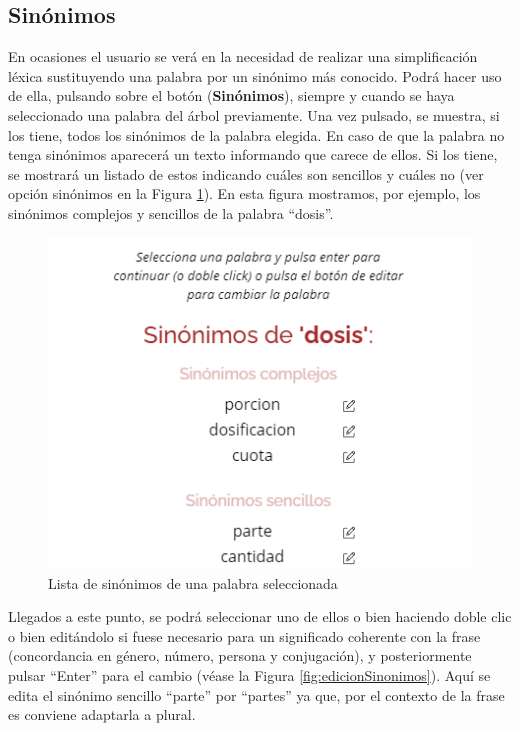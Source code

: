 \subsection{Sinónimos}
En ocasiones el usuario se verá en la necesidad de realizar una simplificación léxica sustituyendo una palabra por un sinónimo más conocido. Podrá hacer uso de ella, pulsando sobre el botón (\textbf{Sinónimos}), siempre y cuando se haya seleccionado una palabra del árbol previamente. Una vez pulsado, se muestra, si los tiene, todos los sinónimos de la palabra elegida. En caso de que la palabra no tenga sinónimos aparecerá un texto informando que carece de ellos. Si los tiene, se mostrará un listado de estos indicando cuáles son sencillos y cuáles no (ver opción sinónimos en la Figura \ref{fig:listaSinonimos}). En esta figura mostramos, por ejemplo, los sinónimos complejos y sencillos de la palabra ``dosis''.

	 \begin{figure}[h!]
	\centering
	
	
	\includegraphics[scale=1.0]{Imagenes/Figuras/SinonimoPersona}
	
	
	\caption{Lista de sinónimos de una palabra seleccionada}
	\label{fig:listaSinonimos}
\end{figure}

 Llegados a este punto, se podrá seleccionar uno de ellos o bien haciendo doble clic o bien editándolo si fuese necesario para un significado coherente con la frase (concordancia en género, número, persona y conjugación), y posteriormente pulsar ``Enter'' para el cambio (véase la Figura \ref{fig:edicionSinonimos}). Aquí se edita el sinónimo sencillo ``parte'' por ``partes'' ya que, por el contexto de la frase es conviene adaptarla a plural.


